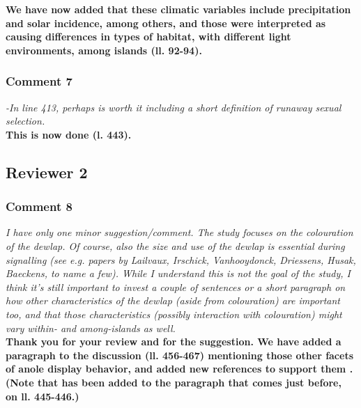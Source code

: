 \documentclass{article}
\begin{document}
	\textbf{We have now added that these climatic variables include precipitation and solar incidence, among others, and those were interpreted as causing differences in types of habitat, with different light environments, among islands (ll. 92-94).}
	
	\subsubsection*{Comment 7}
	
	\textit{-In line 413, perhaps is worth it including a short definition of runaway sexual selection.}\\
	
	\textbf{This is now done (l. 443).}
	
	\pagebreak
	
	\subsection*{Reviewer 2}
	
	\subsubsection*{Comment 8}
	
	\textit{I have only one minor suggestion/comment. The study focuses on the colouration of the dewlap. Of course, also the size and use of the dewlap is essential during signalling (see e.g. papers by Lailvaux, Irschick, Vanhooydonck, Driessens, Husak, Baeckens, to name a few). While I understand this is not the goal of the study, I think it’s still important to invest a couple of sentences or a short paragraph on how other characteristics of the dewlap (aside from colouration) are important too, and that those characteristics (possibly interaction with colouration) might vary within- and among-islands as well.}\\
	
	\textbf{Thank you for your review and for the suggestion. We have added a paragraph to the discussion (ll. 456-467) mentioning those other facets of anole display behavior, and added new references to support them \citep{Vanhooydonck2005, Lailvaux2006, Lailvaux2007, Vanhooydonck2009, Driessens2014, Driessens2015, Lailvaux2015, Driessens2017, Baeckens2018}. (Note that \citealt{Lailvaux2006} has been added to the paragraph that comes just before, on ll. 445-446.)}
	
	\pagebreak
	
	
	
		
\end{document}
